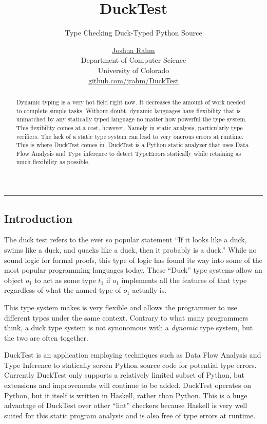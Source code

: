 \documentclass{scrartcl}
\title{DuckTest}
\subtitle{{\textcolor{bardark}{Type Checking Duck-Typed Python Source}}}
\author{\href{http://jarahm.com/}{Joshua Rahm} \\
\footnotesize Department of Computer Science \\
\footnotesize University of Colorado \\
\footnotesize \href{https://github.com/jrahm/DuckTest}{github.com/jrahm/DuckTest}
}
\date{}
\begin{document}
\nocite{*}
\maketitle
\hrule

\begin{multicols}{2}

\begin{abstract}
    Dynamic typing is a very hot field right now. It decreases the amount
    of work needed to complete simple tasks. Without doubt, dynamic languages
    have flexibility that is unmatched by any statically typed language no
    matter how powerful the type system. This flexibility comes at a cost, however.
    Namely in static analysis, particularly type verifiers. The lack of a static
    type system can lead to very onerous errors at runtime. This is where DuckTest
    comes in. DuckTest is a Python static analyzer that uses Data Flow Analysis
    and Type inference to detect TypeErrors statically while retaining as
    much flexibility as possible.
\end{abstract}

\section*{Introduction}

The duck test refers to the ever so popular statement ``If it looks like a duck,
swims like a duck, and quacks like a duck, then it probably is a duck.'' While
no sound logic for formal proofs, this type of logic has found its way into some
of the most popular programming languages today. These ``Duck'' type systems allow
an object $o_1$ to act as some type $t_1$ if $o_1$ implements all the features of
that type regardless of what the named type of $o_1$ actually is.

This type system makes is very flexible and allows the programmer to use
different types under the same context. Contrary to what many programmers
think, a duck type system is not synonomous with a \emph{dynamic} type
system, but the two are often together.

DuckTest is an application employing techniques such as Data Flow Analysis and
Type Inference to statically screen Python source code for potential type errors.
Currently DuckTest only supports a relatively limited subset of Python, but
extensions and improvements will continue to be added. DuckTest operates on Python,
but it itself is written in Haskell, rather than Python. This is a huge advantage
of DuckTest over other ``lint'' checkers because Haskell is very well suited for
this static program analysis and is also free of type errors at runtime.



\end{multicols}
\end{document}
